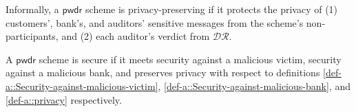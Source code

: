 \vspace{-2mm}

Informally, a $\mathsf{pwdr}$ scheme is privacy-preserving if it protects the privacy of (1)  customers', bank's, and auditors' sensitive messages from the scheme's non-participants,  and (2) each auditor's verdict from $\mathcal{DR}$.%







\vspace{-3.2mm}
\begin{definition}[Security]\label{def-a::PwDR-security}
A $\mathsf{pwdr}$ scheme is secure if it meets security against a malicious victim,  security against a malicious bank, and preserves privacy with respect to definitions \ref{def-a::Security-against-malicious-victim}, \ref{def-a::Security-against-malicious-bank}, and \ref{def-a::privacy} respectively. 
\end{definition}




